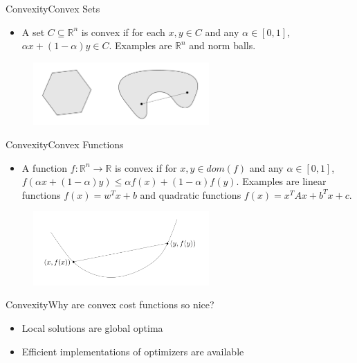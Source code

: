 \begin{frame}{Convexity}{Convex Sets}
	\begin{itemize}
		\item A set $C \subseteq \mathbb{R}^n$ is convex if for each $x, y \in C$ and any $\alpha \in [0,1]$, $\alpha x + (1 - \alpha)y \in C$. Examples are $\mathbb{R}^n$ and norm balls.\\
	\end{itemize}
	\begin{figure}
		\center
		\includegraphics[width=0.6\textwidth]{02_math/02_img/convexsets.png}
	\end{figure}
\end{frame}

\begin{frame}{Convexity}{Convex Functions}
	\begin{itemize}
		\item A function $f : \mathbb{R}^n \rightarrow \mathbb{R}$ is convex if for $x, y \in dom(f)$ and any $\alpha \in [0,1]$, $f(\alpha x + (1 - \alpha)y) \le \alpha f(x) + (1 - \alpha)f(y)$. Examples are linear functions $f(x) = w^Tx + b$ and quadratic functions $f(x) = x^TAx + b^Tx + c$.\\
	\end{itemize}
	\begin{figure}
		\center
		\includegraphics[width=0.6\textwidth]{02_math/02_img/convexfunction.png}
	\end{figure}
\end{frame}

\begin{frame}{Convexity}{Why are convex cost functions so nice?}
	\begin{itemize}
		\item Local solutions are global optima
		\item Efficient implementations of optimizers are available
	\end{itemize}
\end{frame}

